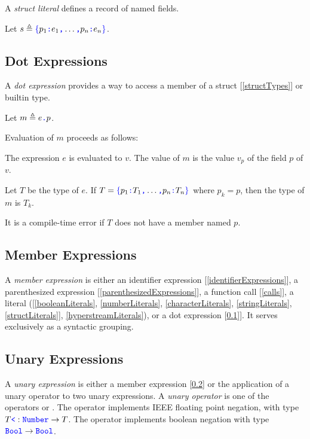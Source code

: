 \documentclass{article}
\begin{document}
A {\em struct literal} defines a record of named fields.

\StructLiteral{}
\Property{}

Let $s \triangleq \texttt{\color{blue} $\{$}{}p_1\texttt{\color{blue} :}{} e_1\texttt{\color{blue} ,}{} \ldots \texttt{\color{blue} ,}{} p_n\texttt{\color{blue} :}{} e_n\texttt{\color{blue} $\}$}$.


\subsection{Dot Expressions}
\label{dotExpressions}

A {\em dot expression} provides a way to access a member of a struct [\ref{structTypes}] or builtin type.

\DotExpression{}

Let $m \triangleq e\texttt{\color{blue} .}{}p$.

Evaluation of $m$ proceeds as follows:

The expression $e$ is evaluated to $v$. The value of $m$ is the value $v_p$ of the field $p$ of $v$.

Let $T$ be the type of $e$. If $T = \texttt{\color{blue} $\{$}{}p_1\texttt{\color{blue} :}{} T_1\texttt{\color{blue} ,}{} \ldots\texttt{\color{blue} ,}{} p_n\texttt{\color{blue} :}{} T_n\texttt{\color{blue} $\}$}$ where $p_k = p$, then the type of $m$ is $T_k$. 

It is a compile-time error if $T$ does not have a member named $p$. 

\subsection{Member Expressions}
\label{memberExpression}

A {\em member expression} is either an identifier expression [\ref{identifierExpressions}], a parenthesized expression [\ref{parenthesizedExpressions}], a function call [\ref{calls}], a literal ([\ref{booleanLiterals}, \ref{numberLiterals}, \ref{characterLiterals}, \ref{stringLiterals}, \ref{structLiterals}], \ref{hyperstreamLiterals}), or a dot expression [\ref{dotExpressions}]]. It serves exclusively as a syntactic grouping.


\subsection{Unary Expressions}
\label{unaryExpressions}

A {\em unary expression} is either a member expression [\ref{memberExpression}] or the application of a unary operator to two unary expressions.
A {\em unary operator} is one of the operators \MINUS{} or  \NOT{}. The \MINUS{} operator implements IEEE floating point negation, with type $T \texttt{\color{blue} \tt<}: \texttt{\color{blue} Number}{} \to T$. The \NOT{} operator implements boolean negation with type $\texttt{\color{blue} Bool}{} \to \texttt{\color{blue} Bool}$.
\end{document}
